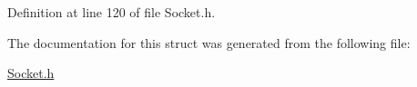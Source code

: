 Definition at line 120 of file Socket.\-h.



The documentation for this struct was generated from the following file\-:\begin{DoxyCompactItemize}
\item 
\hyperlink{Socket_8h}{Socket.\-h}\end{DoxyCompactItemize}
